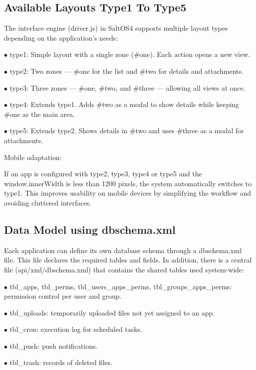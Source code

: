 \documentclass[a4paper]{article}
\begin{document}
\hypertarget{toc55}{}
\subsection{Available Layouts Type1 To Type5}

The interface engine (driver.js) in SaltOS4 supports multiple layout types depending on the application’s needs:

\begin{compactitem}
\item[\color{myblue}$\bullet$] type1: Simple layout with a single zone (\#one). Each action opens a new view.
\item[\color{myblue}$\bullet$] type2: Two zones — \#one for the list and \#two for details and attachments.
\item[\color{myblue}$\bullet$] type3: Three zones — \#one, \#two, and \#three — allowing all views at once.
\item[\color{myblue}$\bullet$] type4: Extends type1. Adds \#two as a modal to show details while keeping \#one as the main area.
\item[\color{myblue}$\bullet$] type5: Extends type2. Shows details in \#two and uses \#three as a modal for attachments.
\end{compactitem}

Mobile adaptation:

If an app is configured with type2, type3, type4 or type5 and the window.innerWidth is less than 1200 pixels, the system automatically switches to type1. This improves usability on mobile devices by simplifying the workflow and avoiding cluttered interfaces.

\hypertarget{toc56}{}
\subsection{Data Model using dbschema.xml}

Each application can define its own database schema through a dbschema.xml file. This file declares the required tables and fields. In addition, there is a central file (api/xml/dbschema.xml) that contains the shared tables used system-wide:

\begin{compactitem}
\item[\color{myblue}$\bullet$] tbl\_apps, tbl\_perms, tbl\_users\_apps\_perms, tbl\_groups\_apps\_perms: permission control per user and group.
\item[\color{myblue}$\bullet$] tbl\_uploads: temporarily uploaded files not yet assigned to an app.
\item[\color{myblue}$\bullet$] tbl\_cron: execution log for scheduled tasks.
\item[\color{myblue}$\bullet$] tbl\_push: push notifications.
\item[\color{myblue}$\bullet$] tbl\_trash: records of deleted files.
\end{compactitem}
\end{document}
